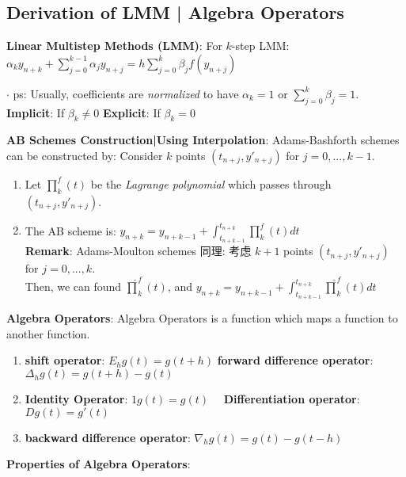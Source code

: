 \documentclass[9pt]{article}
\begin{document}
\subsection{Derivation of LMM | Algebra Operators} %

\textbf{Linear Multistep Methods (LMM)}: {\small For $k$-step LMM:} $\alpha_k y_{n+k}+\sum_{j=0}^{k-1}\alpha_jy_{n+j}=h\sum_{j=0}^{k}\beta_jf(y_{n+j})$ 

$\cdot$ ps: Usually, coefficients are \textit{normalized} to have $\alpha_k=1$ or $\sum_{j=0}^{k}\beta_j=1$. \quad \textbf{Implicit}: If $\beta_k\ne0$ \quad \textbf{Explicit}: If $\beta_k=0$

\textbf{AB Schemes Construction|Using Interpolation}: {\footnotesize Adams-Bashforth schemes can be constructed by: Consider $k$ points $(t_{n+j}, y'_{n+j})$ for $j=0,...,k-1$.}

\begin{enumerate}[itemsep=-2pt, topsep=-2pt]
    \item Let $\prod_{k}^{f}(t)$ be the \textit{Lagrange polynomial} which passes through $(t_{n+j}, y'_{n+j})$.
    \item The AB scheme is: $y_{n+k}=y_{n+k-1}+\int_{t_{n+k-1}}^{t_{n+k}}\prod_{k}^{f}(t)dt$ \\
    \textbf{Remark}: Adams-Moulton schemes {\footnotesize 同理: 考虑} $k+1$ points $(t_{n+j}, y'_{n+j})$ for $j=0,...,k$. \\
    Then, we can found $\widehat{\prod}_{k}^{f}(t)$, and \quad $y_{n+k}=y_{n+k-1}+\int_{t_{n+k-1}}^{t_{n+k}}\widehat{\prod}_{k}^{f}(t)dt$
\end{enumerate}

\textbf{Algebra Operators}: Algebra Operators is a function which maps a function to another function.

\begin{enumerate}[itemsep=-2pt, topsep=-2pt]
    \item \textbf{shift operator}: $E_hg(t)=g(t+h)$ \qquad \textbf{forward difference operator}: $\Delta_hg(t)=g(t+h)-g(t)$
    \item \textbf{Identity Operator}: $1g(t)=g(t)$ \qquad \ \ \textbf{Differentiation operator}: $Dg(t)=g'(t)$
    \item \textbf{backward difference operator}: $\nabla_hg(t)=g(t)-g(t-h)$ 
\end{enumerate}

\textbf{Properties of Algebra Operators}:
\end{document}
